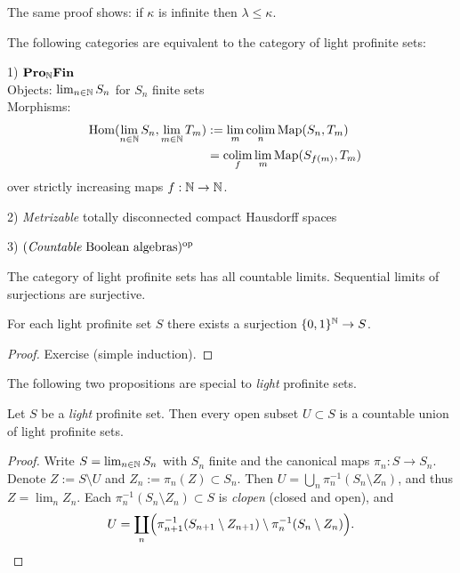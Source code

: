 \documentclass{notes}
\begin{document}
\begin{rem}
The same proof shows: if $\kappa$ is infinite then $\lambda\leq\kappa$.
\end{rem}

\begin{prop}
The following categories are equivalent to the category of light
profinite sets:

1) $\text{\bf Pro}_{{\mathbb{N}}}\text{\bf Fin}$ \\
Objects: $\lim_{n\in{\mathbb{N}}}S_n$ for $S_n$ finite sets
\\
Morphisms: 
\begin{align*}
  \mathrm{Hom}(\lim_{n\in{\mathbb{N}}}S_n,\lim_{m\in{\mathbb{N}}}T_m)
  &:= \lim_m\operatorname*{colim}_n{\rm Map}(S_n,T_m) \cr
  &= \operatorname*{colim}_f\lim_m{\rm Map}(S_{f(m)},T_m)
\end{align*}
over strictly increasing maps $f:{\mathbb{N}}\to{\mathbb{N}}$.
  
2) {\em Metrizable} totally disconnected compact Hausdorff spaces

3) $(\text{{\em Countable} Boolean algebras})^{\rm op}$
\end{prop}

\begin{prop}
The category of light profinite sets has all countable
limits. Sequential limits of surjections are surjective. 
\end{prop}

\begin{prop}
For each light profinite set $S$ there exists a surjection
$\{0,1\}^{\mathbb{N}}\to S$. 
\end{prop}

\begin{proof}
Exercise (simple induction).
\end{proof}

The following two propositions are special to {\em light} profinite
sets. 

\begin{prop}
Let $S$ be a {\em light} profinite set. Then every open subset $U\subset S$
is a countable union of light profinite sets. 
\end{prop}

\begin{proof}
Write $S=\lim_{n\in{\mathbb{N}}}S_n$ with $S_n$ finite and the canonical maps
$\pi_n:S\to S_n$. Denote $Z:=S\setminus U$ and $Z_n:=\pi_n(Z)\subset S_n$.
Then $U=\bigcup_n\pi_n^{-1}(S_n\setminus Z_n)$, and thus $Z=\lim_nZ_n$. 
Each $\pi_n^{-1}(S_n\setminus Z_n)\subset S$ is {\em clopen} (closed
and open), and
$$
  U = \coprod_n\Bigl(\pi_{n+1}^{-1}(S_{n+1}\setminus Z_{n+1})\setminus
  \pi_n^{-1}(S_n\setminus Z_n)\Bigr).
$$
\end{proof}
\end{document}
